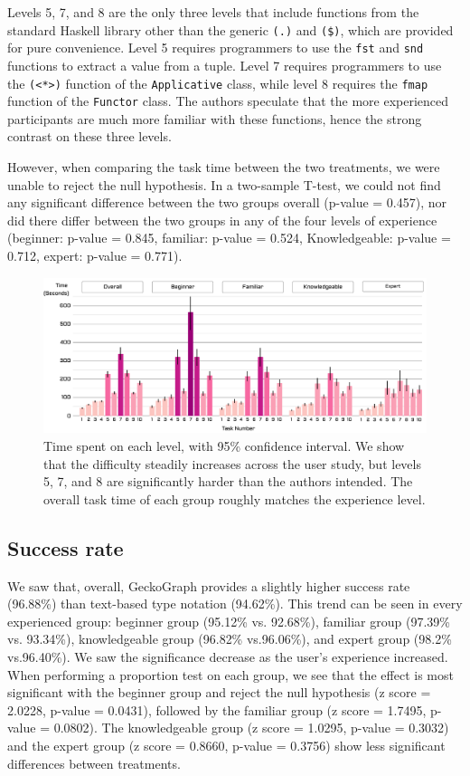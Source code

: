 \documentclass[preprint,12pt]{elsarticle}
\begin{document}
Levels 5, 7, and 8 are the only three levels that include functions from the standard Haskell library other than the generic \texttt{(.)} and \texttt{(\$)}, which are provided for pure convenience. Level 5 requires programmers to use the \texttt{fst} and \texttt{snd} functions to extract a value from a tuple. Level 7 requires programmers to use the \texttt{(<*>)} function of the \texttt{Applicative} class, while level 8 requires the \texttt{fmap} function of the \texttt{Functor} class. The authors speculate that the more experienced participants are much more familiar with these functions, hence the strong contrast on these three levels. 

However, when comparing the task time between the two treatments, we were unable to reject the null hypothesis. In a two-sample T-test, we could not find any significant difference between the two groups overall (p-value = 0.457), nor did there differ between the two groups in any of the four levels of experience (beginner: p-value = 0.845, familiar: p-value = 0.524, Knowledgeable: p-value = 0.712, expert: p-value = 0.771).

\begin{figure}[]
  \includegraphics[width=\linewidth]{figures/LevelTime}
  \caption{\label{fig:level-time} Time spent on each level, with 95\% confidence interval. We show that the difficulty steadily increases across the user study, but levels 5, 7, and 8 are significantly harder than the authors intended. The overall task time of each group roughly matches the experience level.}
\end{figure}

\subsection{Success rate}
We saw that, overall, GeckoGraph provides a slightly higher success rate (96.88\%) than text-based type notation (94.62\%). This trend can be seen in every experienced group: beginner group (95.12\% vs. 92.68\%), familiar group (97.39\% vs. 93.34\%), knowledgeable group (96.82\% vs.96.06\%), and expert group (98.2\% vs.96.40\%). We saw the significance decrease as the user's experience increased. When performing a proportion test on each group, we see that the effect is most significant with the beginner group and reject the null hypothesis (z score = 2.0228, p-value = 0.0431), followed by the familiar group (z score = 1.7495, p-value = 0.0802). The knowledgeable group (z score = 1.0295, p-value = 0.3032) and the expert group (z score = 0.8660, p-value = 0.3756) show less significant differences between treatments. 
\end{document}
